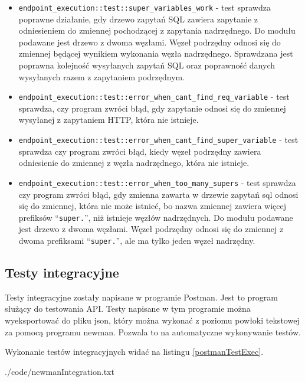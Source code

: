 \begin{itemize}
    \item \verb|endpoint_execution::test::super_variables_work| - test sprawdza
        poprawne działanie, gdy drzewo zapytań SQL zawiera zapytanie z
        odniesieniem do zmiennej pochodzącej z zapytania nadrzędnego. Do modułu
        podawane jest drzewo z dwoma węzłami. Węzeł podrzędny odnosi się do
        zmiennej będącej wynikiem wykonania węzła nadrzędnego. Sprawdzana jest
        poprawna kolejność wysyłanych zapytań SQL oraz poprawność danych
        wysyłanych razem z zapytaniem podrzędnym.

    \item \verb|endpoint_execution::test::error_when_cant_find_req_variable| -
        test sprawdza, czy program zwróci błąd, gdy zapytanie odnosi się do
        zmiennej wysyłanej z zapytaniem HTTP, która nie istnieje.

    \item \verb|endpoint_execution::test::error_when_cant_find_super_variable| -
        test sprawdza czy program zwróci błąd, kiedy węzeł podrzędny zawiera
        odniesienie do zmiennej z węzła nadrzędnego, która nie istnieje.

    \item \verb|endpoint_execution::test::error_when_too_many_supers| - test
        sprawdza czy program zwróci błąd, gdy zmienna zawarta w drzewie zapytań
        sql odnosi się do zmiennej, która nie może istnieć, bo nazwa zmiennej
        zawiera więcej prefiksów ``\verb|super.|'', niż istnieje węzłów
        nadrzędnych. Do modułu podawane jest drzewo z dwoma węzłami. Węzeł
        podrzędny odnosi się do zmiennej z dwoma prefiksami ``\verb|super.|'',
        ale ma tylko jeden węzeł nadrzędny.

\end{itemize}

\subsection{Testy integracyjne}

Testy integracyjne zostały napisane w programie Postman. Jest to program służący
do testowania API. Testy napisane w tym programie można wyeksportować do pliku
json, który można wykonać z poziomu powłoki tekstowej za pomocą programu
newman. Pozwala to na automatyczne wykonywanie testów.

Wykonanie testów integracyjnych widać na listingu \ref{postmanTestExec}.

{
    \small
    \singlespacing
    
    {./code/newmanIntegration.txt}
}



